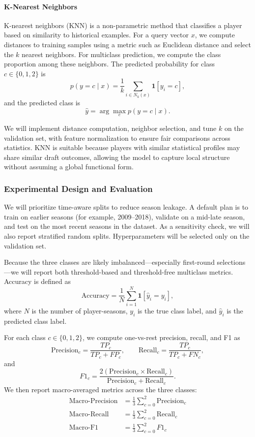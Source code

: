 \paragraph{K-Nearest Neighbors}
K-nearest neighbors (KNN) is a non-parametric method that classifies a player based on similarity to historical examples. For a query vector $x$, we compute distances to training samples using a metric such as Euclidean distance and select the $k$ nearest neighbors. For multiclass prediction, we compute the class proportion among these neighbors. The predicted probability for class $c \in \{0,1,2\}$ is
\[
p(y=c \mid x) = \frac{1}{k} \sum_{i \in N_k(x)} \mathbf{1}[y_i = c],
\]
and the predicted class is
\[
\hat{y} = \arg\max_c p(y=c \mid x).
\]

We will implement distance computation, neighbor selection, and tune $k$ on the validation set, with feature normalization to ensure fair comparisons across statistics. KNN is suitable because players with similar statistical profiles may share similar draft outcomes, allowing the model to capture local structure without assuming a global functional form.

\subsubsection{Experimental Design and Evaluation}

We will prioritize time-aware splits to reduce season leakage. A default plan is to train on earlier seasons (for example, 2009--2018), validate on a mid-late season, and test on the most recent seasons in the dataset. As a sensitivity check, we will also report stratified random splits. Hyperparameters will be selected only on the validation set.

Because the three classes are likely imbalanced---especially first-round selections---we will report both threshold-based and threshold-free multiclass metrics. Accuracy is defined as
\[
\text{Accuracy} = \frac{1}{N}\sum_{i=1}^{N}\mathbf{1}[\hat{y}_i = y_i],
\]
where $N$ is the number of player-seasons, $y_i$ is the true class label, and $\hat{y}_i$ is the predicted class label.

For each class $c \in \{0,1,2\}$, we compute one-vs-rest precision, recall, and F1 as
\[
\text{Precision}_c = \frac{TP_c}{TP_c + FP_c},
\qquad
\text{Recall}_c = \frac{TP_c}{TP_c + FN_c},
\]
and
\[
F1_c = \frac{2(\text{Precision}_c \times \text{Recall}_c)}{\text{Precision}_c + \text{Recall}_c}.
\]
We then report macro-averaged metrics across the three classes:
\begin{align*}
\text{Macro-Precision} &= \frac{1}{3}\sum_{c=0}^{2}\text{Precision}_c \\
\text{Macro-Recall} &= \frac{1}{3}\sum_{c=0}^{2}\text{Recall}_c \\
\text{Macro-F1} &= \frac{1}{3}\sum_{c=0}^{2}F1_c
\end{align*}

